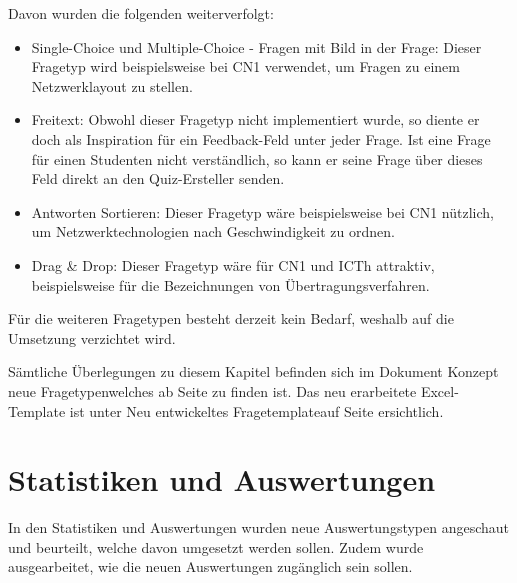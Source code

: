 \bigskip

Davon wurden die folgenden weiterverfolgt:
\begin{itemize}
	\item Single-Choice und Multiple-Choice - Fragen mit Bild in der Frage:
	Dieser Fragetyp wird beispielsweise bei \acrshort{CN1} verwendet, um Fragen zu einem Netzwerklayout zu stellen.
	\item Freitext:
	Obwohl dieser Fragetyp nicht implementiert wurde, so diente er doch als Inspiration für ein Feedback-Feld unter jeder Frage. Ist eine Frage für einen Studenten nicht verständlich, so kann er seine Frage über dieses Feld direkt an den Quiz-Ersteller senden.
	\item Antworten Sortieren:
	Dieser Fragetyp wäre beispielsweise bei \acrshort{CN1} nützlich, um Netzwerktechnologien nach Geschwindigkeit zu ordnen.
	\item Drag \& Drop:
	Dieser Fragetyp wäre für \acrshort{CN1} und \acrshort{ICTh} attraktiv, beispielsweise für die Bezeichnungen von Übertragungsverfahren.
\end{itemize}

\noindent Für die weiteren Fragetypen besteht derzeit kein Bedarf, weshalb auf die Umsetzung verzichtet wird.

\bigskip

Sämtliche Überlegungen zu diesem Kapitel befinden sich im Dokument \glqq Konzept neue Fragetypen\grqq welches ab Seite \hyperlink{page.\getpagerefnumber{pdf:konzeptFragen}}{} zu finden ist.
Das neu erarbeitete Excel-Template ist unter \glqq Neu entwickeltes Fragetemplate\grqq auf Seite \hyperlink{page.\getpagerefnumber{pdf:excelTemplate}}{} ersichtlich.

\section{Statistiken und Auswertungen}
In den Statistiken und Auswertungen wurden neue Auswertungstypen angeschaut und beurteilt, welche davon umgesetzt werden sollen. Zudem wurde ausgearbeitet, wie die neuen Auswertungen zugänglich sein sollen.

\bigskip

